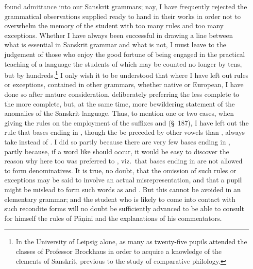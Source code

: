 found admittance into our Sanskrit grammars; nay, I have frequently
rejected the grammatical observations supplied ready to hand in their
works in order not to overwhelm the memory of the student with too many
rules and too many exceptions. Whether I have always been successful in
drawing a line between what is essential in Sanskrit grammar and what is
not, I must leave to the judgement of those who enjoy the good fortune
of being engaged in the practical teaching of a language the students of
which may be counted no longer by tens, but by hundreds.\footnote{In the
  University of Leipsig alone, as many as twenty-five pupils attended
  the classes of Professor Brockhaus in order to acquire a knowledge of
  the elements of Sanskrit, previous to the study of comparative
  philology.} I only wish it to be understood that where I have left out
rules or exceptions, contained in other grammars, whether native or
European, I have done so after mature consideration, deliberately
preferring the less complete to the more complete, but, at the same
time, more bewildering statement of the anomalies of the Sanskrit
language. Thus, to mention one or two cases, when giving the rules on
the employment of the suffixes  and  (\S~187), I have
left out the rule that bases ending in , though the  be
preceded by other vowels than , always take  instead of
. I did so partly because there are very few bases ending in
, partly because, if a word like  should occur, it
would be easy to discover the reason why here too  was preferred
to , viz.\ that bases ending in  are not allowed to form
denominatives. It is true, no doubt, that the omission of such rules or
exceptions may be said to involve an actual misrepresentation, and that
a pupil might be mislead to form such words as  and
. But this cannot be avoided in an elementary grammar; and
the student who is likely to come into contact with such recondite forms
will no doubt be sufficiently advanced to be able to consult for himself
the rules of Pāṇini and the explanations of his commentators.

